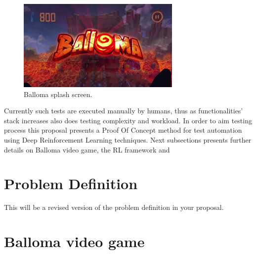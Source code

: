 \documentclass[peerreview]{IEEEtran}
\begin{document}
%
%
\begin{figure}[!h]
\centering
\includegraphics[width=0.8\columnwidth]{img/balloma_cover.jpeg} 
\caption{Balloma splash screen.}
\label{fig_sim}
\end{figure}

Currently such tests are executed manually by humans, thus as functionalities' stack increases also does testing complexity and workload. In order to aim testing process this proposal presents a Proof Of Concept method for test automation using Deep Reinforcement Learning techniques. Next subsections presents further details on Balloma video game, the RL framework and  

\section{Problem Definition}
This will be a revised version of the problem definition in your proposal.


\section{Balloma video game}
  
\end{document}
